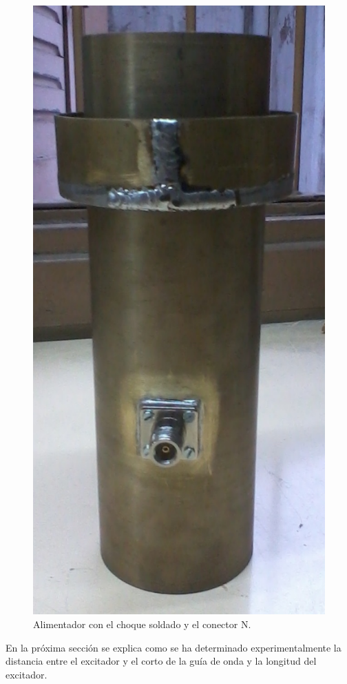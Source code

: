 \begin{figure} [H]
\centering 
\includegraphics[scale = 0.25]{Figures/Resultados/resultados_9}
\caption{Alimentador con el choque soldado y el conector N.}
\label{fig_resultados:9}
\end{figure}
En la próxima sección se explica como se ha determinado experimentalmente la distancia entre el excitador y el corto de la guía de onda y la longitud del excitador.

